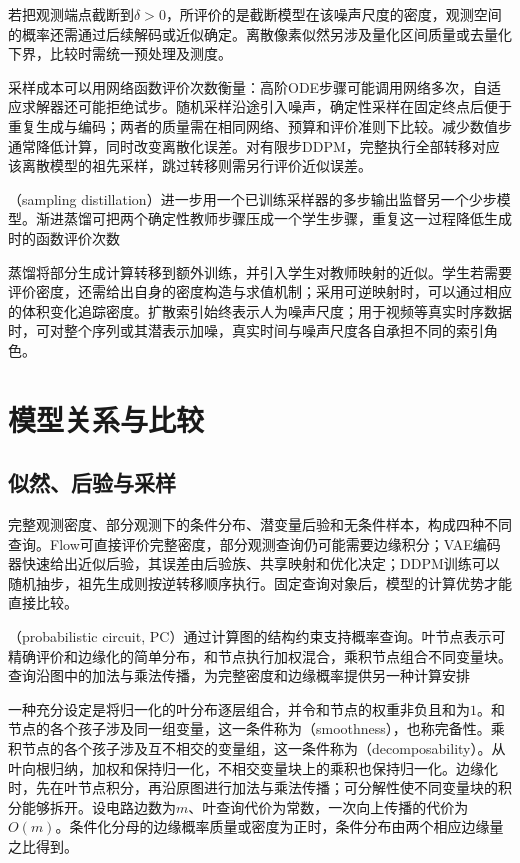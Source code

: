 若把观测端点截断到$\delta>0$，所评价的是截断模型在该噪声尺度的密度，观测空间的概率还需通过后续解码或近似确定。离散像素似然另涉及量化区间质量或去量化下界，比较时需统一预处理及测度。

采样成本可以用网络函数评价次数衡量：高阶ODE步骤可能调用网络多次，自适应求解器还可能拒绝试步。随机采样沿途引入噪声，确定性采样在固定终点后便于重复生成与编码；两者的质量需在相同网络、预算和评价准则下比较。减少数值步通常降低计算，同时改变离散化误差。对有限步DDPM，完整执行全部转移对应该离散模型的祖先采样，跳过转移则需另行评价近似误差。

（sampling distillation）进一步用一个已训练采样器的多步输出监督另一个少步模型。渐进蒸馏可把两个确定性教师步骤压成一个学生步骤，重复这一过程降低生成时的函数评价次数

蒸馏将部分生成计算转移到额外训练，并引入学生对教师映射的近似。学生若需要评价密度，还需给出自身的密度构造与求值机制；采用可逆映射时，可以通过相应的体积变化追踪密度。扩散索引始终表示人为噪声尺度；用于视频等真实时序数据时，可对整个序列或其潜表示加噪，真实时间与噪声尺度各自承担不同的索引角色。

\section{模型关系与比较}
\label{sec:pgm-generative-comparison}

\subsection{似然、后验与采样}
\label{sec:pgm-generative-likelihood-posterior-sampling}

完整观测密度、部分观测下的条件分布、潜变量后验和无条件样本，构成四种不同查询。Flow可直接评价完整密度，部分观测查询仍可能需要边缘积分；VAE编码器快速给出近似后验，其误差由后验族、共享映射和优化决定；DDPM训练可以随机抽步，祖先生成则按逆转移顺序执行。固定查询对象后，模型的计算优势才能直接比较。

（probabilistic circuit, PC）通过计算图的结构约束支持概率查询。叶节点表示可精确评价和边缘化的简单分布，和节点执行加权混合，乘积节点组合不同变量块。查询沿图中的加法与乘法传播，为完整密度和边缘概率提供另一种计算安排

一种充分设定是将归一化的叶分布逐层组合，并令和节点的权重非负且和为$1$。和节点的各个孩子涉及同一组变量，这一条件称为（smoothness），也称完备性。乘积节点的各个孩子涉及互不相交的变量组，这一条件称为（decomposability）。从叶向根归纳，加权和保持归一化，不相交变量块上的乘积也保持归一化。边缘化时，先在叶节点积分，再沿原图进行加法与乘法传播；可分解性使不同变量块的积分能够拆开。设电路边数为$m$、叶查询代价为常数，一次向上传播的代价为$O(m)$。条件化分母的边缘概率质量或密度为正时，条件分布由两个相应边缘量之比得到。

